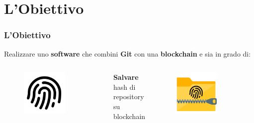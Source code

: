 \documentclass{beamer}
\begin{document}
\section{L'Obiettivo}
\begin{frame}
	\frametitle{L'Obiettivo}
	Realizzare uno \textbf{software} che combini \textbf{Git} con una \textbf{blockchain} e sia in grado di:
	\medskip
	\begin{columns}
		\centering
		\begin{figure}
			\includegraphics[width=0.7\textwidth]{figures/fingerprint.png}
		\end{figure}
		\textbf{Salvare} hash di
		repository su
		blockchain
		\centering
		\begin{figure}
			\includegraphics[width=0.7\textwidth]{figures/folder_zip.png}

\end{figure}
\end{columns}
\end{frame}
\end{document}
